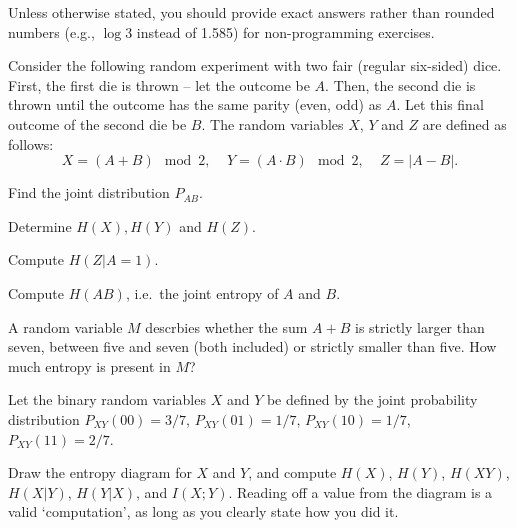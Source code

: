 \documentclass[a4paper,10pt,landscape,twocolumn]{scrartcl}
\begin{document}
\homeworkproblems

Unless otherwise stated, you should provide exact answers rather than rounded numbers (e.g., $\log 3$ instead of 1.585) for non-programming exercises.

\begin{exercise}
Consider the following random experiment with two fair (regular six-sided) dice. First, the first die is thrown -- let the outcome be $A$. Then, the second die is thrown until the outcome has the same parity (even, odd) as $A$. Let this final outcome of the second die be $B$. The random variables $X$, $Y$ and $Z$ are defined as follows:
\[
X = (A + B) \mod 2, \ \ \ \ \ Y = (A \cdot B) \mod 2, \ \ \ \ \ Z = |A - B|.
\]
	\begin{subex}[(1pt)]
	Find the joint distribution $P_{AB}$.
	\end{subex}
	\begin{subex}[(1pt)]
	Determine $H(X), H(Y)$ and $H(Z)$.
	\end{subex}
	\begin{subex}[(1pt)]
	Compute $H(Z|A=1)$.
	\end{subex}
	\begin{subex}[(1pt)]
	Compute $H(AB)$, i.e.\ the joint entropy of $A$ and $B$.
	\end{subex}
	\begin{subex}[(2pt)]
	A random variable $M$ descrbies whether the sum $A + B$ is strictly larger than seven, between five and seven (both included) or strictly smaller than five. How much entropy is present in $M$?
	\end{subex}
\end{exercise}

\begin{exercise}
Let the binary random variables $X$ and $Y$ be defined by the joint probability distribution $P_{XY}(00) = 3/7$, $P_{XY}(01) = 1/7$, $P_{XY}(10) = 1/7$, $P_{XY}(11) = 2/7$.

Draw the entropy diagram for $X$ and $Y$, and compute $H(X)$, $H(Y)$, $H(XY)$, $H(X|Y)$, $H(Y|X)$, and $I(X;Y)$. Reading off a value from the diagram is a valid `computation', as long as you clearly state how you did it.
\begin{center}
\end{center}
\end{exercise}
\end{document}
